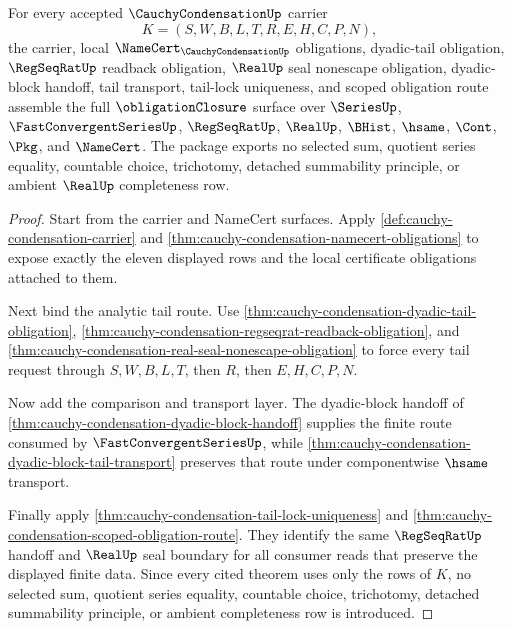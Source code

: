 \begin{theorem}
\label{thm:cauchy-condensation-obligation-closure-package}
For every accepted $\CauchyCondensationUp$ carrier
$$
K=(S,W,B,L,T,R,E,H,C,P,N),
$$
the carrier, local $\NameCert_{\CauchyCondensationUp}$ obligations, dyadic-tail obligation, $\RegSeqRatUp$ readback obligation, $\RealUp$ seal nonescape obligation, dyadic-block handoff, tail transport, tail-lock uniqueness, and scoped obligation route assemble the full $\obligationClosure$ surface over $\SeriesUp$, $\FastConvergentSeriesUp$, $\RegSeqRatUp$, $\RealUp$, $\BHist$, $\hsame$, $\Cont$, $\Pkg$, and $\NameCert$. The package exports no selected sum, quotient series equality, countable choice, trichotomy, detached summability principle, or ambient $\RealUp$ completeness row.
\end{theorem}
\begin{proof}
Start from the carrier and NameCert surfaces. Apply \autoref{def:cauchy-condensation-carrier} and \autoref{thm:cauchy-condensation-namecert-obligations} to expose exactly the eleven displayed rows and the local certificate obligations attached to them.

Next bind the analytic tail route. Use \autoref{thm:cauchy-condensation-dyadic-tail-obligation}, \autoref{thm:cauchy-condensation-regseqrat-readback-obligation}, and \autoref{thm:cauchy-condensation-real-seal-nonescape-obligation} to force every tail request through $S,W,B,L,T$, then $R$, then $E,H,C,P,N$.

Now add the comparison and transport layer. The dyadic-block handoff of \autoref{thm:cauchy-condensation-dyadic-block-handoff} supplies the finite route consumed by $\FastConvergentSeriesUp$, while \autoref{thm:cauchy-condensation-dyadic-block-tail-transport} preserves that route under componentwise $\hsame$ transport.

Finally apply \autoref{thm:cauchy-condensation-tail-lock-uniqueness} and \autoref{thm:cauchy-condensation-scoped-obligation-route}. They identify the same $\RegSeqRatUp$ handoff and $\RealUp$ seal boundary for all consumer reads that preserve the displayed finite data. Since every cited theorem uses only the rows of $K$, no selected sum, quotient series equality, countable choice, trichotomy, detached summability principle, or ambient completeness row is introduced.
\end{proof}

